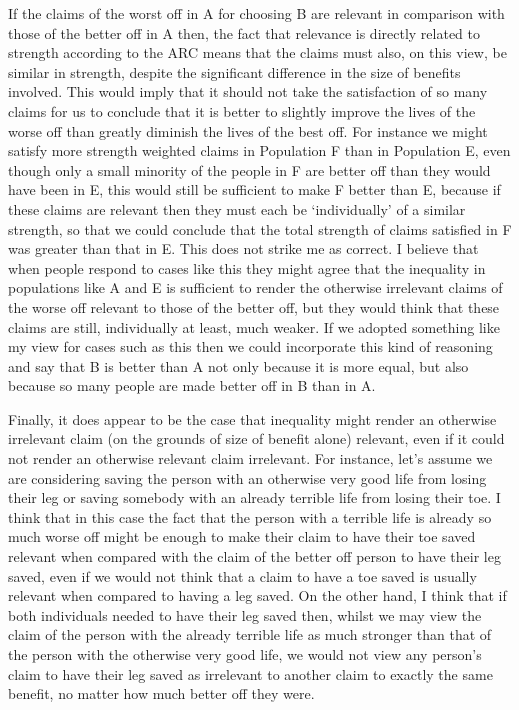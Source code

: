 \documentclass[man,11pt,a4paper]{apa7}
\begin{document}
If the claims of the worst off in A for choosing B are relevant in comparison with those of the better off in A then, the fact that relevance is directly related to strength according to the ARC means that the claims must also, on this view, be similar in strength, despite the significant difference in the size of benefits involved. This would imply that it should not take the satisfaction of so many claims for us to conclude that it is better to slightly improve the lives of the worse off than greatly diminish the lives of the best off. For instance we might satisfy more strength weighted claims in Population F than in Population E, even though only a small minority of the people in F are better off than they would have been in E, this would still be sufficient to make F better than E, because if these claims are relevant then they must each be `individually' of a similar strength, so that we could conclude that the total strength of claims satisfied in F was greater than that in E. This does not strike me as correct. I believe that when people respond to cases like this they might agree that the inequality in populations like A and E is sufficient to render the otherwise irrelevant claims of the worse off relevant to those of the better off, but they would think that these claims are still, individually at least, much weaker. If we adopted something like my view for cases such as this then we could incorporate this kind of reasoning and say that B is better than A not only because it is more equal, but also because so many people are made better off in B than in A.

Finally, it does appear to be the case that inequality might render an otherwise irrelevant claim (on the grounds of size of benefit alone) relevant, even if it could not render an otherwise relevant claim irrelevant. For instance, let's assume we are considering saving the person with an otherwise very good life from losing their leg or saving somebody with an already terrible life from losing their toe. I think that in this case the fact that the person with a terrible life is already so much worse off might be enough to make their claim to have their toe saved relevant when compared with the claim of the better off person to have their leg saved, even if we would not think that a claim to have a toe saved is usually relevant when compared to having a leg saved. On the other hand, I think that if both individuals needed to have their leg saved then, whilst we may view the claim of the person with the already terrible life as much stronger than that of the person with the otherwise very good life, we would not view any person's claim to have their leg saved as irrelevant to another claim to exactly the same benefit, no matter how much better off they were.
\end{document}
